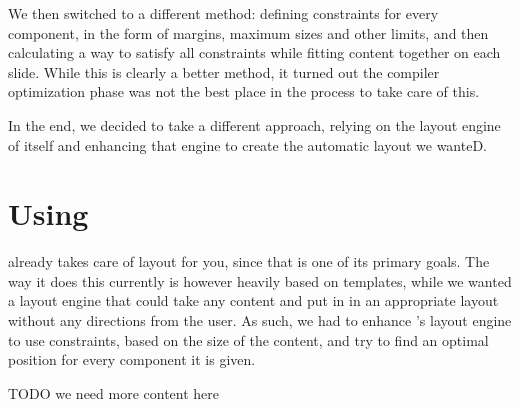    We then switched to a different method: defining constraints for every
   component, in the form of margins, maximum sizes and other limits, and then
   calculating a way to satisfy all constraints while fitting content together
   on each slide. While this is clearly a better method, it turned out the
   compiler optimization phase was not the best place in the process to take
   care of this.

   In the end, we decided to take a different approach, relying on the layout
   engine of \mxp itself and enhancing that engine to create the automatic
   layout we wanteD.

  \section{Using \mxp}

   \mxp already takes care of layout for you, since that is one of its primary
   goals. The way it does this currently is however heavily based on templates,
   while we wanted a layout engine that could take any content and put in in an
   appropriate layout without any directions from the user. As such, we had to
   enhance \mxp's layout engine to use constraints, based on the size of the
   content, and try to find an optimal position for every component it is
   given.

   TODO we need more content here

